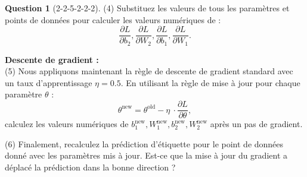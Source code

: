 \documentclass[12pt]{article}
\newif\ifsolution
\theoremstyle{definition}
\newtheorem{exercise}{Question}%
\newtheorem{answer}{Réponse} %
\newcommand{\Answer}[1]{
\ifsolution\color{answer}\begin{answer}#1\end{answer}\fi
}
\newif\ifsolution
\newcommand{\pd}[2]{\dfrac{\partial #1}{\partial #2}}
\begin{document}
\begin{exercise}[2-2-5-2-2-2]
{\noindent (4) Substituez les valeurs de tous les paramètres et points de données pour calculer les valeurs numériques de :
\begin{equation*}
    \pd{L}{b_2}, \pd{L}{W_2}, \pd{L}{b_1}, \pd{L}{W_1}. 
\end{equation*}

\textbf{Descente de gradient :}\\
\noindent (5) Nous appliquons maintenant la règle de descente de gradient standard avec un taux d'apprentissage $\eta = 0.5$. En utilisant la règle de mise à jour pour chaque paramètre $\theta$ :
\begin{equation}
    \theta^{\text{new}} = \theta^{\text{old}} - \eta\ \cdot \pd{L}{\theta},
    \label{eq:update}
\end{equation}
calculez les valeurs numériques de $b^{\text{new}}_1, W^{\text{new}}_1, b^{\text{new}}_2, W^{\text{new}}_2$ après un pas de gradient.

\noindent (6) Finalement, recalculez la prédiction d'étiquette pour le point de données donné avec les paramètres mis à jour. Est-ce que la mise à jour du gradient a déplacé la prédiction dans la bonne direction ?
}

\Answer{
}

\end{exercise}
\end{document}
